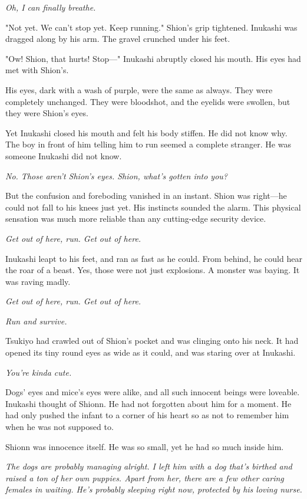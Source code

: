 \emph{Oh, I can finally breathe.}

"Not yet. We can't stop yet. Keep running." Shion's grip tightened.
Inukashi was dragged along by his arm. The gravel crunched under his
feet.

"Ow! Shion, that hurts! Stop---" Inukashi abruptly closed his mouth. His
eyes had met with Shion's.

His eyes, dark with a wash of purple, were the same as always. They were
completely unchanged. They were bloodshot, and the eyelids were swollen,
but they were Shion's eyes.

Yet Inukashi closed his mouth and felt his body stiffen. He did not know
why. The boy in front of him telling him to run seemed a complete
stranger. He was someone Inukashi did not know.

\emph{No. Those aren't Shion's eyes. Shion, what's gotten into you?}

But the confusion and foreboding vanished in an instant. Shion was
right---he could not fall to his knees just yet. His instincts sounded the
alarm. This physical sensation was much more reliable than any
cutting-edge security device.

\emph{Get out of here, run. Get out of here.}

Inukashi leapt to his feet, and ran as fast as he could. From behind, he
could hear the roar of a beast. Yes, those were not just explosions. A
monster was baying. It was raving madly.

\emph{Get out of here, run. Get out of here.}

\emph{Run and survive.}

Tsukiyo had crawled out of Shion's pocket and was clinging onto his
neck. It had opened its tiny round eyes as wide as it could, and was
staring over at Inukashi.

\emph{You're kinda cute.}

Dogs' eyes and mice's eyes were alike, and all such innocent beings were
loveable. Inukashi thought of Shionn. He had not forgotten about him for
a moment. He had only pushed the infant to a corner of his heart so as
not to remember him when he was not supposed to.

Shionn was innocence itself. He was so small, yet he had so much inside
him.

\emph{The dogs are probably managing alright. I left him with a dog that's
birthed and raised a ton of her own puppies. Apart from her, there are a
few other caring females in waiting. He's probably sleeping right now,
protected by his loving nurse.}

